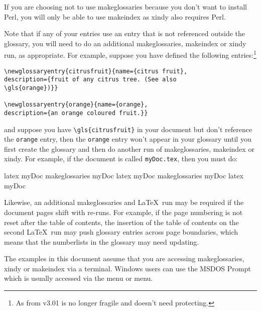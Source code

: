\documentclass[report,inlinetitle]{nlctdoc}
\begin{document}
\begin{important}
If you are choosing not to use \gls*{makeglossaries} because you
don't want to install Perl, you will only be able to use
\gls*{makeindex} as \gls*{xindy} also requires Perl.
\end{important}

Note that if any of your entries use an entry
that is not referenced outside the glossary, you will need to
do an additional \gls{makeglossaries}, \gls{makeindex}
or \gls{xindy} run, as appropriate. For example,
suppose you have defined the following entries:\footnote{As from
v3.01  is no longer fragile and doesn't need protecting.}
\begin{verbatim}
\newglossaryentry{citrusfruit}{name={citrus fruit},
description={fruit of any citrus tree. (See also 
\gls{orange})}}

\newglossaryentry{orange}{name={orange},
description={an orange coloured fruit.}}
\end{verbatim}
and suppose you have \verb|\gls{citrusfruit}| in your document
but don't reference the \texttt{orange} entry, then the
\texttt{orange} entry won't appear in your glossary until
you first create the glossary and then do another run
of \gls{makeglossaries}, \gls{makeindex} or \gls{xindy}.
For example, if the document is called \texttt{myDoc.tex}, then
you must do:
\begin{prompt}
latex myDoc
makeglossaries myDoc
latex myDoc
makeglossaries myDoc
latex myDoc
\end{prompt}

Likewise, an additional \gls{makeglossaries} and \LaTeX\ run
may be required if the document pages shift with re-runs. For
example, if the page numbering is not reset after the table of
contents, the insertion of the table of contents on the second
\LaTeX\ run may push glossary entries across page boundaries, which
means that the \glspl{numberlist} in the glossary may 
need updating.

The examples in this document assume that you are accessing
\gls{makeglossaries}, \gls{xindy} or \gls{makeindex} via a terminal.
Windows users can use the MSDOS Prompt which is usually accessed via
the  menu or
 menu.
\end{document}
